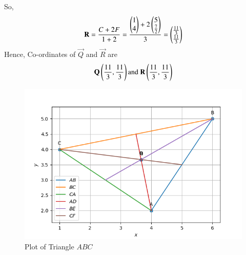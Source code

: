 \documentclass[journal]{IEEEtran}
\numberwithin{equation}{enumi}
\numberwithin{figure}{enumi}
\begin{document}
So,\\
\begin{align}
	\mathbf{R}=\frac{C+2F}{1+2}=\frac{\begin{pmatrix}1\\4\end{pmatrix} + 2\begin{pmatrix}5\\\frac{7}{2}\end{pmatrix}}{3}=\begin{pmatrix}\frac{11}{3}\\ \frac{11}{3}\end{pmatrix}
\end{align}
Hence, Co-ordinates of $\vec{Q}$ and $\vec{R}$ are\\
\begin{align}
    \vec{Q}\brak{\frac{11}{3},\frac{11}{3}} \text{and}\ \vec{R}\brak{\frac{11}{3},\frac{11}{3}}
\end{align}
\begin{figure}[h!]
   \centering
   \includegraphics[width=0.7\linewidth]{Figure_1.png}
   \caption{Plot of Triangle $ABC$}
   \label{stemplot}
\end{figure}
\end{document}
